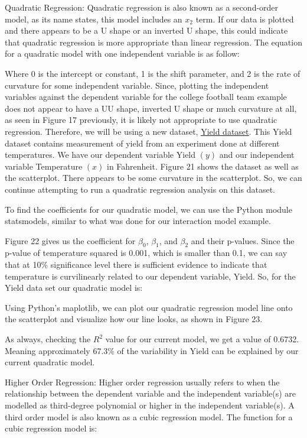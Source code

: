 \documentclass[a4paper,12pt]{report}
\newcommand{\link}[2]{\hyperlink{#1}{\underline{#2}}}
\begin{document}
Quadratic Regression:
Quadratic regression is also known as a second-order model, as its name states, this model includes an $x_2$ term. If our data is plotted and there appears to be a U shape or an inverted U shape, this could indicate that quadratic regression is more appropriate than linear regression. The equation for a quadratic model with one independent variable is as follow:

Where 0 is the intercept or constant, 1 is the shift parameter, and 2 is the rate of curvature for some independent variable. 
Since, plotting the independent variables against the dependent variable for the college football team example does not appear to have a UU shape, inverted U shape or much curvature at all, as seen in Figure 17 previously, it is likely not appropriate to use quadratic regression. Therefore, we will be using a new dataset, \link{https://online.stat.psu.edu/stat462/node/159/}{Yield dataset}. This Yield dataset contains measurement of yield from an experiment done at different temperatures. We have our dependent variable Yield $(y)$ and our independent variable Temperature $(x)$ in Fahrenheit. Figure 21 shows the dataset as well as the scatterplot. There appears to be some curvature in the scatterplot. So, we can continue attempting to run a quadratic regression analysis on this dataset.

To find the coefficients for our quadratic model, we can use the Python module statsmodels, similar to what was done for our interaction model example. 

Figure 22 gives us the coefficient for $\beta_0$, $\beta_1$, and $\beta_2$ and their p-values. Since the p-value of temperature squared is 0.001, which is smaller than 0.1, we can say that at 10\% significance level there is sufficient evidence to indicate that temperature is curvilinearly related to our dependent variable, Yield. So, for the Yield data set our quadratic model is:

Using Python’s maplotlib, we can plot our quadratic regression model line onto the scatterplot and visualize how our line looks, as shown in Figure 23. 

As always, checking the $R^2$ value for our current model, we get a value of 0.6732. Meaning approximately 67.3\% of the variability in Yield can be explained by our current quadratic model. 

Higher Order Regression:
Higher order regression usually refers to when the relationship between the dependent variable and the independent variable(s) are modelled as third-degree polynomial or higher in the independent variable(s). A third order model is also known as a cubic regression model. The function for a cubic regression model is:
\end{document}
